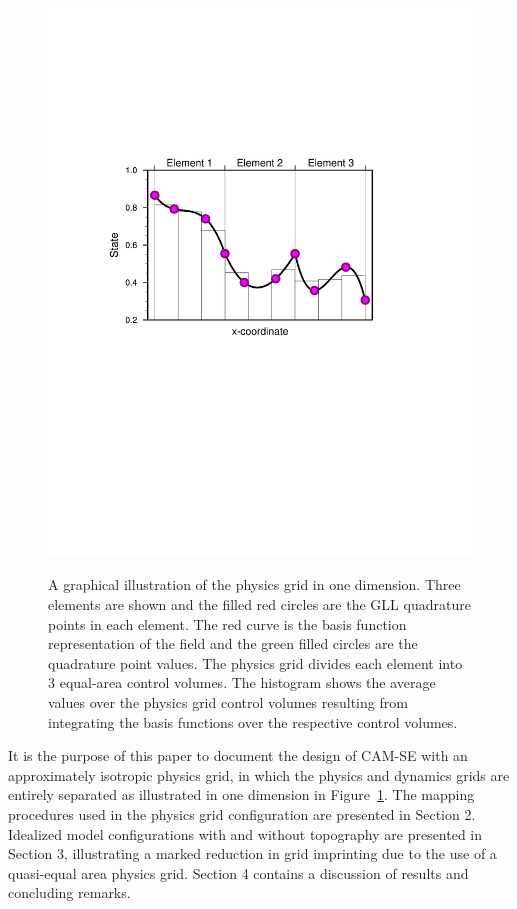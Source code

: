 \documentclass[twocol]{ametsoc}
\begin{document}
\begin{figure}[t]
\noindent\includegraphics[width=38pc,angle=0]{figs/physgrid-1d_3x3-arh.pdf}\\
\caption{A graphical illustration of the physics grid in one dimension. Three elements are shown and the filled red circles are the GLL quadrature points in each element. The red curve is the basis function representation of the field and the green filled circles are the quadrature point values. The physics grid divides each element into 3 equal-area control volumes. The histogram shows the average values over the physics grid control volumes resulting from integrating the basis functions over the respective control volumes.}
\label{fig:physgrid-1d}
\end{figure}


It is the purpose of this paper to document the design of CAM-SE with an approximately isotropic physics grid, in which the physics and dynamics grids are entirely separated as illustrated in one dimension in Figure~\ref{fig:physgrid-1d}. The mapping procedures used in the physics grid configuration are presented in Section 2. Idealized model configurations with and without topography are presented in Section 3, illustrating a marked reduction in grid imprinting due to the use of a quasi-equal area physics grid. Section 4 contains a discussion of results and concluding remarks. 
\end{document}
